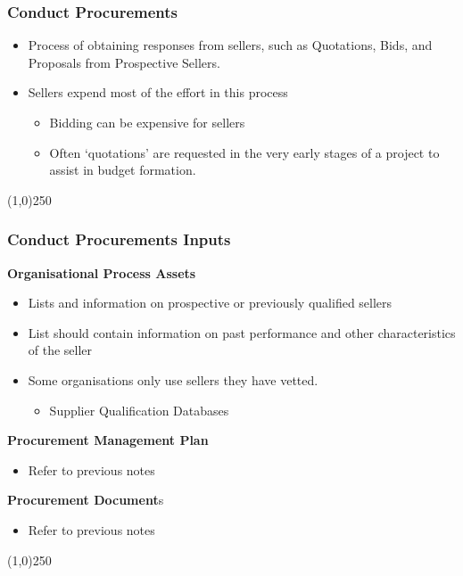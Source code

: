 \begin{frame}
\frametitle{Conduct Procurements}
\begin{itemize}
	\item Process of obtaining responses from sellers, such as Quotations, Bids, and Proposals from Prospective Sellers.
	\item Sellers expend most of the effort in this process
	\begin{itemize}
		\item Bidding can be expensive for sellers
		\item Often `quotations' are requested in the very early stages of a project to assist in budget formation. 
	\end{itemize}
\end{itemize}
\end{frame}\begin{center}\line(1,0){250}\end{center}




\begin{frame}
\frametitle{Conduct Procurements \hfill\hfill Inputs}
\textbf{Organisational Process Assets}
		\begin{itemize}
			\item Lists and information on prospective or previously qualified sellers
			\item List should contain information on past performance and other characteristics of the seller
			\item Some organisations only use sellers they have vetted.
			\begin{itemize}
				\item Supplier Qualification Databases
			\end{itemize}
		\end{itemize}
\textbf{Procurement Management Plan}
\begin{itemize}
	\item Refer to previous notes
\end{itemize}
\textbf{Procurement Document}s
	\begin{itemize}
		\item Refer to previous notes
	\end{itemize}
\end{frame}\begin{center}\line(1,0){250}\end{center}



